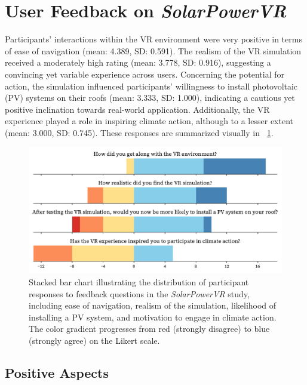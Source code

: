 \documentclass[draft, final]{vutinfth} %
\begin{document}
\section{User Feedback on \textit{SolarPowerVR}}

Participants' interactions within the VR environment were very positive in terms of ease of navigation (mean: 4.389, SD: 0.591).
The realism of the VR simulation received a moderately high rating (mean: 3.778, SD: 0.916), suggesting a convincing yet variable experience across users.
Concerning the potential for action, the simulation influenced participants' willingness to install photovoltaic (PV) systems on their roofs (mean: 3.333, SD: 1.000), indicating a cautious yet positive inclination towards real-world application.
Additionally, the VR experience played a role in inspiring climate action, although to a lesser extent (mean: 3.000, SD: 0.745).
These responses are summarized visually in \figurename~\ref{fig:feedback-solarpowervr}.

\begin{figure}[h]
    \centering
    \includegraphics[width=\textwidth]{graphics/feedback-solarpowervr.pdf}
    \caption{Stacked bar chart illustrating the distribution of participant responses to feedback questions in the \textit{SolarPowerVR} study, including ease of navigation, realism of the simulation, likelihood of installing a PV system, and motivation to engage in climate action. The color gradient progresses from red (strongly disagree) to blue (strongly agree) on the Likert scale.}
    \label{fig:feedback-solarpowervr}
\end{figure}

\subsection{Positive Aspects}
\end{document}
